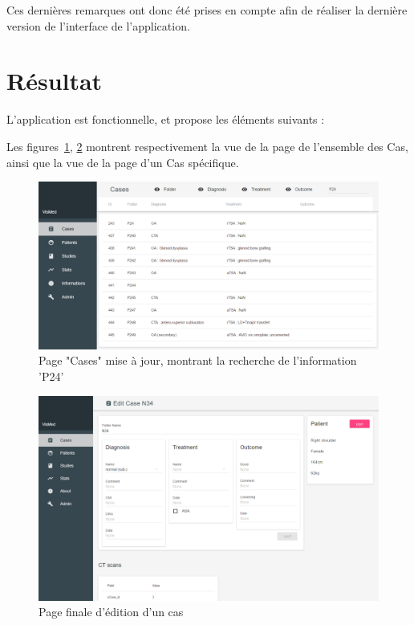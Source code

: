 	Ces dernières remarques ont donc été prises en compte afin de réaliser la dernière version de l'interface de l'application.

\section{Résultat}

	L'application est fonctionnelle, et propose les éléments suivants :

	Les figures~\ref{cases1}, \ref{cases2} montrent respectivement la vue de la page de l'ensemble des Cas, ainsi que la vue de la page d'un Cas spécifique.

	\begin{figure}[!h]
		\centering
		\includegraphics[width=1\textwidth]{images/realisation/cases1}
		\caption{Page "Cases" mise à jour, montrant la recherche de l'information 'P24'}
		\label{cases1}
	\end{figure}

	\begin{figure}[!h]
		\centering
		\includegraphics[width=1\textwidth]{images/realisation/cases2}
		\caption{Page finale d'édition d'un cas}
		\label{cases2}
	\end{figure}

